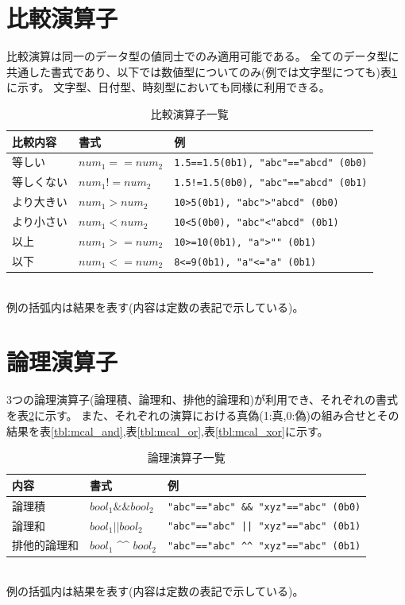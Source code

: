 \section{比較演算子}
比較演算は同一のデータ型の値同士でのみ適用可能である。
全てのデータ型に共通した書式であり、以下では数値型についてのみ(例では文字型につても)表\ref{tbl:mcal_ope_comp}に示す。
文字型、日付型、時刻型においても同様に利用できる。

\begin{table}[!hb]
\begin{center}
\caption{比較演算子一覧\label{tbl:mcal_ope_comp}}
{\small
  \begin{tabular}{l|l|l} \hline
比較内容&書式&例\\
\hline
等しい     & $num_1==num_2$ & \verb|1.5==1.5(0b1), "abc"=="abcd" (0b0)|\\
等しくない & $num_1!=num_2$ & \verb|1.5!=1.5(0b0), "abc"=="abcd" (0b1)|\\
より大きい & $num_1>num_2$  & \verb|10>5(0b1), "abc">"abcd" (0b0)|\\
より小さい & $num_1<num_2$  & \verb|10<5(0b0), "abc"<"abcd" (0b1)|\\
以上       & $num_1>=num_2$ & \verb|10>=10(0b1), "a">"" (0b1) |\\
以下       & $num_1<=num_2$ & \verb|8<=9(0b1), "a"<="a" (0b1)| \\
\hline
  \end{tabular}
\\例の括弧内は結果を表す(内容は定数の表記で示している)。
  }
  \end{center}
\end{table}


\section{論理演算子}
3つの論理演算子(論理積、論理和、排他的論理和)が利用でき、それぞれの書式を表\ref{tbl:mcal_bool}に示す。
また、それぞれの演算における真偽(1:真,0:偽)の組み合せとその結果を表\ref{tbl:mcal_and},表\ref{tbl:mcal_or},表\ref{tbl:mcal_xor}に示す。

\begin{table}[!hb]
\begin{center}
\caption{論理演算子一覧\label{tbl:mcal_bool}}
{\small
  \begin{tabular}{l|l|l} \hline
内容&書式&例\\
\hline
論理積       & $bool_1 \&\& bool_2$ & \verb|"abc"=="abc" && "xyz"=="abc" (0b0)|\\
論理和       & $bool_1 ||   bool_2$ & \verb/"abc"=="abc" || "xyz"=="abc" (0b1)/\\
排他的論理和 & $bool_1$ \^{}\^{} $bool_2$ & \verb|"abc"=="abc" ^^ "xyz"=="abc" (0b1)|\\
\hline
  \end{tabular}
\\例の括弧内は結果を表す(内容は定数の表記で示している)。
  }
  \end{center}
\end{table}

